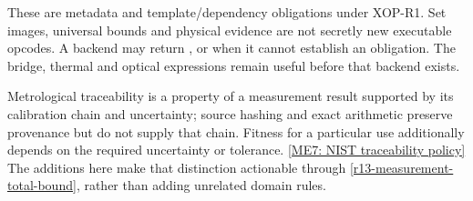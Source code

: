 These are metadata and template/dependency obligations under XOP-R1. Set
images, universal bounds and physical evidence are not secretly new executable
opcodes. A backend may return ,  or
 when it cannot establish an obligation. The bridge,
thermal and optical expressions remain useful before that backend exists.

Metrological traceability is a property of a measurement result supported by
its calibration chain and uncertainty; source hashing and exact arithmetic
preserve provenance but do not supply that chain. Fitness for a particular
use additionally depends on the required uncertainty or tolerance.
\href{https://www.nist.gov/calibrations/traceability}{[ME7: NIST traceability policy]}
The additions here make that distinction actionable through
\eqref{r13-measurement-total-bound}, rather than adding unrelated domain rules.
